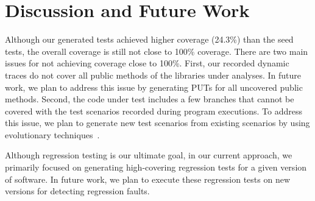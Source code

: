 \section{Discussion and Future Work}
\label{sec:discussion}

Although our generated tests achieved higher coverage (24.3\%) than the seed tests, the overall coverage
is still not close to 100\% coverage. There are two main issues for not achieving coverage
close to 100\%. First, our recorded dynamic traces do not cover all public methods of the libraries under analyses.
In future work, we plan to address this issue by generating PUTs for all uncovered public methods. Second,
the code under test includes a few branches that cannot be covered with the test scenarios recorded
during program executions. To address this issue, we plan to generate new test scenarios
from existing scenarios by using evolutionary techniques~\cite{tonella:etoc}.

Although regression testing is our ultimate goal, in our current approach, we primarily focused on 
generating high-covering regression tests for a given version of software. In future work, we plan to 
execute these regression tests on new versions for detecting regression faults.